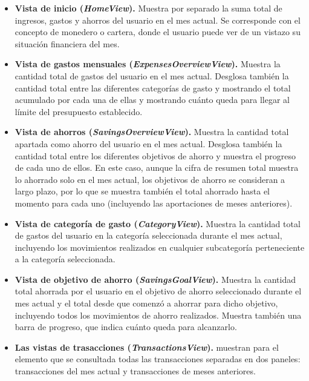 \begin{itemize}
    \item \textbf{Vista de inicio (\textit{HomeView}).} Muestra por separado la suma total de ingresos, gastos y ahorros del usuario en el mes actual. Se corresponde con el concepto de monedero o cartera, donde el usuario puede ver de un vistazo su situación financiera del mes.
    \item \textbf{Vista de gastos mensuales (\textit{ExpensesOverviewView}).} Muestra la cantidad total de gastos del usuario en el mes actual. Desglosa también la cantidad total entre las diferentes categorías de gasto y mostrando el total acumulado por cada una de ellas y mostrando cuánto queda para llegar al límite del presupuesto establecido.
    \item \textbf{Vista de ahorros (\textit{SavingsOverviewView}).} Muestra la cantidad total apartada como ahorro del usuario en el mes actual. Desglosa también la cantidad total entre los diferentes objetivos de ahorro y muestra el progreso de cada uno de ellos. En este caso, aunque la cifra de resumen total muestra lo ahorrado solo en el mes actual, los objetivos de ahorro se consideran a largo plazo, por lo que se muestra también el total ahorrado hasta el momento para cada uno (incluyendo las aportaciones de meses anteriores).
    \item \textbf{Vista de categoría de gasto (\textit{CategoryView}).} Muestra la cantidad total de gastos del usuario en la categoría seleccionada durante el mes actual, incluyendo los movimientos realizados en cualquier subcategoría perteneciente a la categoría seleccionada.
    \item \textbf{Vista de objetivo de ahorro (\textit{SavingsGoalView}).} Muestra la cantidad total ahorrada por el usuario en el objetivo de ahorro seleccionado durante el mes actual y el total desde que comenzó a ahorrar para dicho objetivo, incluyendo todos los movimientos de ahorro realizados. Muestra también una barra de progreso, que indica cuánto queda para alcanzarlo. 
    \item \textbf{Las vistas de trasacciones (\textit{TransactionsView}).} muestran para el elemento que se consultada todas las transacciones separadas en dos paneles: transacciones del mes actual y transacciones de meses anteriores.
\end{itemize}


